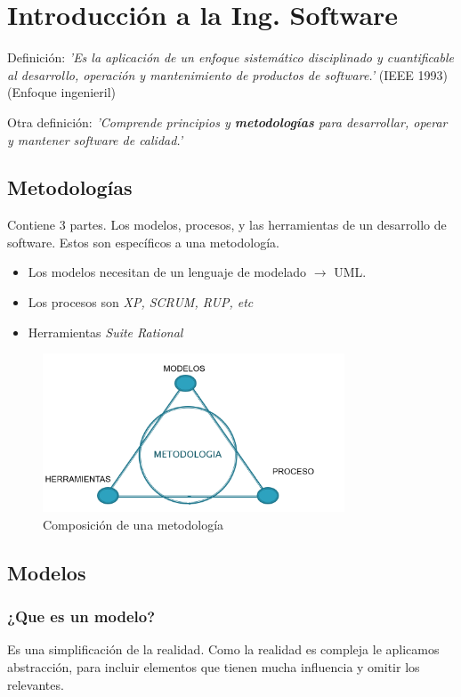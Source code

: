 \documentclass[titlepage,a4paper]{article}
\begin{document}
\section{Introducción a la Ing. Software}
Definición: \textit{'Es la aplicación de un enfoque sistemático disciplinado y cuantificable al desarrollo, operación y mantenimiento de productos de software.'} (IEEE 1993) (Enfoque ingenieril)

\medskip

Otra definición: \textit{'Comprende principios y \textbf{metodologías} para desarrollar, operar y mantener software de calidad.'}


\subsection{Metodologías}
Contiene 3 partes. Los modelos, procesos, y las herramientas de un desarrollo de software. Estos son específicos a una metodología.

    \begin{itemize}
        \item Los modelos necesitan de un lenguaje de modelado $\rightarrow$ UML.
        \item Los procesos son \textit{XP, SCRUM, RUP, etc}
        \item Herramientas \textit{Suite Rational}
    \end{itemize}
    
    \begin{figure}[!htb]
        \centering
        \includegraphics[width=0.8\textwidth]{Imagenes/Metodologias.png}
        \caption{Composición de una metodología}
    \end{figure}

\subsection{Modelos}
\subsubsection*{¿Que es un modelo?}
Es una simplificación de la realidad. Como la realidad es compleja le aplicamos abstracción, para incluir elementos que tienen mucha influencia y omitir los relevantes.
\end{document}
